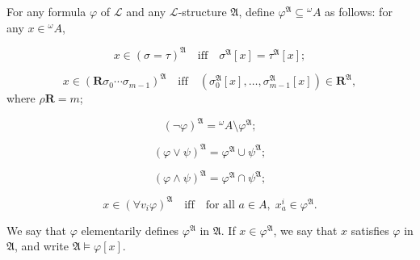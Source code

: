 For any formula $\varphi$ of $\mathcal{L}$ and any $\mathcal{L}$-structure $\mathfrak{A}$, define $\varphi^{\mathfrak{A}} \subseteq {}^\omega A$ as follows: for any $x \in {}^\omega A$,

$$x \in (\sigma = \tau)^{\mathfrak{A}} \quad\text{iff}\quad \sigma^{\mathfrak{A}}[x] = \tau^{\mathfrak{A}}[x];$$

$$x \in (\mathbf{R}\sigma_0 \cdots \sigma_{m-1})^{\mathfrak{A}} \quad\text{iff}\quad (\sigma_0^{\mathfrak{A}}[x], \ldots, \sigma_{m-1}^{\mathfrak{A}}[x]) \in \mathbf{R}^{\mathfrak{A}},$$
where $\rho\mathbf{R} = m$;

$$(\neg\varphi)^{\mathfrak{A}} = {}^\omega A \setminus \varphi^{\mathfrak{A}};$$

$$(\varphi \lor \psi)^{\mathfrak{A}} = \varphi^{\mathfrak{A}} \cup \psi^{\mathfrak{A}};$$

$$(\varphi \land \psi)^{\mathfrak{A}} = \varphi^{\mathfrak{A}} \cap \psi^{\mathfrak{A}};$$

$$x \in (\forall v_i \varphi)^{\mathfrak{A}} \quad\text{iff}\quad \text{for all } a \in A,\; x_a^i \in \varphi^{\mathfrak{A}}.$$

We say that $\varphi$ elementarily defines $\varphi^{\mathfrak{A}}$ in $\mathfrak{A}$. If $x \in \varphi^{\mathfrak{A}}$, we say that $x$ satisfies $\varphi$ in $\mathfrak{A}$, and write $\mathfrak{A} \models \varphi[x]$.
